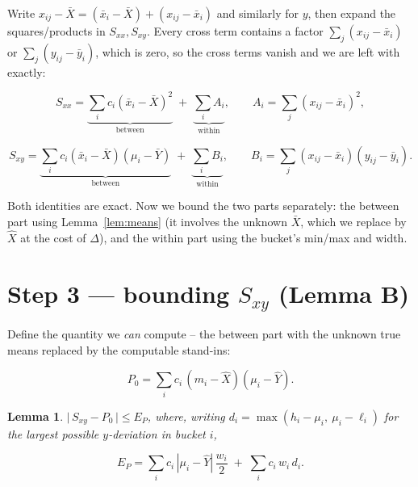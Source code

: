 \documentclass[11pt]{article}
\newtheorem{lemma}{Lemma}
\begin{document}
Write $x_{ij}-\bar X=(\bar x_i-\bar X)+(x_{ij}-\bar x_i)$ and similarly
for $y$, then expand the squares/products in $S_{xx},S_{xy}$. Every
cross term contains a factor $\sum_j(x_{ij}-\bar x_i)$ or
$\sum_j(y_{ij}-\bar y_i)$, which is zero, so the cross terms vanish and
we are left with exactly:

\[
S_{xx}=\underbrace{\sum_i c_i(\bar x_i-\bar X)^2}_{\text{between}}
       \;+\;\underbrace{\sum_i A_i}_{\text{within}},
\qquad
A_i=\sum_j (x_{ij}-\bar x_i)^2,
\]

\[
S_{xy}=\underbrace{\sum_i c_i(\bar x_i-\bar X)(\mu_i-\bar Y)}_{\text{between}}
       \;+\;\underbrace{\sum_i B_i}_{\text{within}},
\qquad
B_i=\sum_j (x_{ij}-\bar x_i)(y_{ij}-\bar y_i).
\]

Both identities are exact. Now we bound the two parts separately: the
between part using Lemma~\ref{lem:means} (it involves the unknown
$\bar X$, which we replace by $\hat X$ at the cost of $\Delta$), and the
within part using the bucket's min/max and width.

\section{Step 3 --- bounding $S_{xy}$ (Lemma B)}

Define the quantity we \emph{can} compute -- the between part with the
unknown true means replaced by the computable stand-ins:

\[
P_0=\sum_i c_i\,(m_i-\hat X)(\mu_i-\hat Y).
\]

\begin{lemma}\label{lem:B}
$\bigl|\,S_{xy}-P_0\,\bigr|\le E_P$, where, writing
$d_i=\max(h_i-\mu_i,\ \mu_i-\ell_i)$ for the largest possible
$y$-deviation in bucket $i$,

\[
E_P=\sum_i c_i\,|\mu_i-\hat Y|\,\frac{w_i}{2}
   \;+\;\sum_i c_i\,w_i\,d_i.
\]
\end{lemma}
\end{document}
